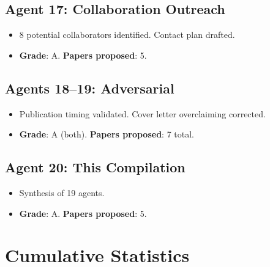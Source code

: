 \documentclass[11pt,a4paper]{article}
\begin{document}
\subsection{Agent 17: Collaboration Outreach}
\begin{itemize}[nosep]
\item 8 potential collaborators identified. Contact plan drafted.
\item \textbf{Grade}: A. \textbf{Papers proposed}: 5.
\end{itemize}

\subsection{Agents 18--19: Adversarial}
\begin{itemize}[nosep]
\item Publication timing validated. Cover letter overclaiming corrected.
\item \textbf{Grade}: A (both). \textbf{Papers proposed}: 7 total.
\end{itemize}

\subsection{Agent 20: This Compilation}
\begin{itemize}[nosep]
\item Synthesis of 19 agents.
\item \textbf{Grade}: A. \textbf{Papers proposed}: 5.
\end{itemize}

\section{Cumulative Statistics}
\end{document}
